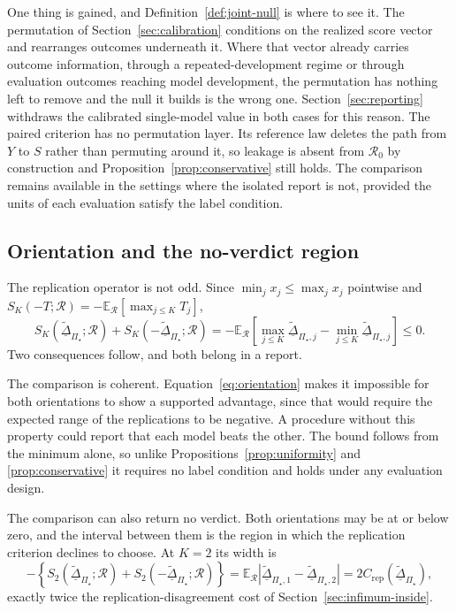 \documentclass[11pt]{article}
\newcommand{\Regime}{\mathcal{R}}
\newcommand{\PSet}{\Pi_\star}
\newcommand{\E}{\mathbb{E}}
\newcommand{\RobDta}{\underline{\widetilde{\Delta}}_{\PSet}}
\theoremstyle{remark}
\begin{document}
One thing is gained, and Definition~\ref{def:joint-null} is where to see it. The permutation of Section~\ref{sec:calibration} conditions on the realized score vector and rearranges outcomes underneath it. Where that vector already carries outcome information, through a repeated-development regime or through evaluation outcomes reaching model development, the permutation has nothing left to remove and the null it builds is the wrong one. Section~\ref{sec:reporting} withdraws the calibrated single-model value in both cases for this reason. The paired criterion has no permutation layer. Its reference law deletes the path from $Y$ to $S$ rather than permuting around it, so leakage is absent from $\Regime_0$ by construction and Proposition~\ref{prop:conservative} still holds. The comparison remains available in the settings where the isolated report is not, provided the units of each evaluation satisfy the label condition.

\subsection{Orientation and the no-verdict region}
\label{sec:orientation}

The replication operator is not odd. Since $\min_j x_j\leq\max_j x_j$ pointwise and $S_K(-T;\Regime)=-\E_{\Regime}[\max_{j\leq K}T_j]$,
\begin{equation}
S_K(\RobDta;\Regime)
+
S_K(-\RobDta;\Regime)
=
-\E_{\Regime}
\left[
\max_{j\leq K}\underline{\widetilde{\Delta}}_{\PSet,j}-\min_{j\leq K}\underline{\widetilde{\Delta}}_{\PSet,j}
\right]
\leq
0 .
\label{eq:orientation}
\end{equation}
Two consequences follow, and both belong in a report.

The comparison is coherent. Equation~\eqref{eq:orientation} makes it impossible for both orientations to show a supported advantage, since that would require the expected range of the replications to be negative. A procedure without this property could report that each model beats the other. The bound follows from the minimum alone, so unlike Propositions~\ref{prop:uniformity} and \ref{prop:conservative} it requires no label condition and holds under any evaluation design.

The comparison can also return no verdict. Both orientations may be at or below zero, and the interval between them is the region in which the replication criterion declines to choose. At $K=2$ its width is
\[
-\left\{
S_2(\RobDta;\Regime)+S_2(-\RobDta;\Regime)
\right\}
=
\E_{\Regime}
\left|
\underline{\widetilde{\Delta}}_{\PSet,1}-\underline{\widetilde{\Delta}}_{\PSet,2}
\right|
=
2C_{\mathrm{rep}}(\RobDta),
\]
exactly twice the replication-disagreement cost of Section~\ref{sec:infimum-inside}.
\end{document}
